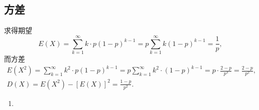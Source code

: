 \subsection{方差}
\setcounter{prob}{20}
\begin{prob}
	求得期望
	\[
		E(X)=\sum_{k=1}^{\infty}k\cdot p(1-p)^{k-1}=p\sum_{k=1}^{\infty}k(1-p)^{k-1}=\frac{1}{p},
	\]
	而方差
	\begin{gather*}
		E(X^2)=\sum_{k=1}^{\infty}k^2\cdot p(1-p)^{k-1}=p\sum_{k=1}^{\infty}k^2\cdot (1-p)^{k-1}
		=p\cdot\frac{2-p}{p^3}=\frac{2-p}{p^2},\\
		D(X)=E(X^2)-[E(X)]^2=\frac{1-p}{p^2}.
	\end{gather*}
\end{prob}
\setcounter{prob}{25}
\begin{prob}
	\begin{enumerate}
	\item
	\end{enumerate}
\end{prob}
